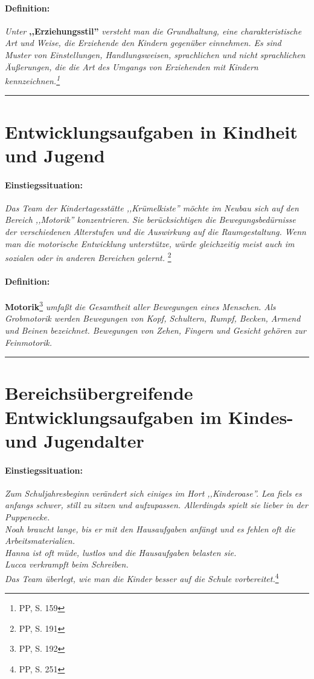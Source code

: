\documentclass[12pt,a4paper]{article}
\newcommand\einstieg{\paragraph{\color{amethyst} {Einstiegssituation:}}}
\newcommand\definition{\paragraph{\color{red} {Definition:}}}
\begin{document}
\definition {\sl Unter} {\bf ,,Erziehungsstil''}
\sl{versteht man die Grundhaltung, eine charakteristische Art und Weise, die
  Erziehende den Kindern gegenüber einnehmen. Es sind Muster von Einstellungen,
  Handlungsweisen, sprachlichen und nicht sprachlichen Äußerungen, die die Art
  des Umgangs von Erziehenden mit Kindern kennzeichnen.}\footnote{\label{Erziehungsstiel} PP, S. 159}

\vskip 16pt \hrule
{ \color{coolblack}
  \section{Entwicklungsaufgaben in Kindheit und Jugend} }

\einstieg {\sl Das Team der Kindertagesstätte ,,Krümelkiste'' möchte im Neubau
  sich auf den Bereich ,,Motorik'' konzentrieren. Sie berücksichtigen die
  Bewegungsbedürnisse der verschiedenen Alterstufen und die Auswirkung auf die
  Raumgestaltung. Wenn man die motorische Entwicklung unterstütze, würde
  gleichzeitig meist auch im sozialen oder in anderen Bereichen gelernt. }\footnote{\label{F-K} PP, S. 191}

\definition {\bf Motorik}\footnote{\label{Motorik} PP, S. 192}
 \sl{umfaßt die Gesamtheit aller Bewegungen eines Menschen. Als
  Grobmotorik werden Bewegungen von Kopf, Schultern, Rumpf, Becken, Armend und
  Beinen bezeichnet. Bewegungen von Zehen, Fingern und Gesicht gehören zur
  Feinmotorik.}

\vskip 16pt \hrule
{ \color{coolblack}
  \section{Bereichsübergreifende Entwicklungsaufgaben im Kindes- und Jugendalter} }

\einstieg {\sl Zum Schuljahresbeginn verändert sich einiges im Hort
  ,,Kinderoase''. Lea fiels es anfangs schwer, still zu sitzen und aufzupassen.
  Allerdingds spielt sie lieber in der Puppenecke. \\
  Noah braucht lange, bis er mit den Hausaufgaben anfängt und es fehlen oft die
  Arbeitsmaterialien. \\
  Hanna ist oft müde, lustlos und die Hausaufgaben belasten sie. \\
  Lucca verkrampft beim Schreiben. \\
  Das Team überlegt, wie man die Kinder besser auf die Schule vorbereitet.}\footnote{\label{F-Ko} PP, S. 251}
\end{document}
